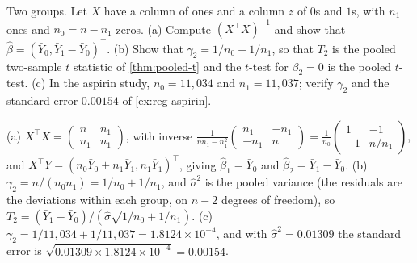 \begin{exercise}
\label{ex:mreg-groups}
Two groups. Let $X$ have a column of ones and a column $z$ of $0$s and $1$s, with $n_1$ ones and $n_0 = n - n_1$ zeros. (a) Compute $(X^\top X)^{-1}$ and show that $\hat{\beta} = (\bar{Y}_0, \bar{Y}_1 - \bar{Y}_0)^\top$. (b) Show that $\gamma_2 = 1/n_0 + 1/n_1$, so that $T_2$ is the pooled two-sample $t$ statistic of \cref{thm:pooled-t} and the $t$-test for $\beta_2 = 0$ is the pooled $t$-test. (c) In the aspirin study, $n_0 = 11{,}034$ and $n_1 = 11{,}037$; verify $\gamma_2$ and the standard error $0.00154$ of \cref{ex:reg-aspirin}.
\end{exercise}
\begin{solution}
(a) $X^\top X = \begin{pmatrix} n & n_1 \\ n_1 & n_1\end{pmatrix}$, with inverse $\frac{1}{nn_1 - n_1^2}\begin{pmatrix} n_1 & -n_1 \\ -n_1 & n\end{pmatrix} = \frac{1}{n_0}\begin{pmatrix} 1 & -1 \\ -1 & n/n_1\end{pmatrix}$, and $X^\top Y = (n_0\bar{Y}_0 + n_1\bar{Y}_1, n_1\bar{Y}_1)^\top$, giving $\hat{\beta}_1 = \bar{Y}_0$ and $\hat{\beta}_2 = \bar{Y}_1 - \bar{Y}_0$. (b) $\gamma_2 = n/(n_0n_1) = 1/n_0 + 1/n_1$, and $\hat{\sigma}^2$ is the pooled variance (the residuals are the deviations within each group, on $n - 2$ degrees of freedom), so $T_2 = (\bar{Y}_1 - \bar{Y}_0)/(\hat{\sigma}\sqrt{1/n_0 + 1/n_1})$. (c) $\gamma_2 = 1/11{,}034 + 1/11{,}037 = 1.8124 \times 10^{-4}$, and with $\hat{\sigma}^2 = 0.01309$ the standard error is $\sqrt{0.01309 \times 1.8124 \times 10^{-4}} = 0.00154$.
\end{solution}

